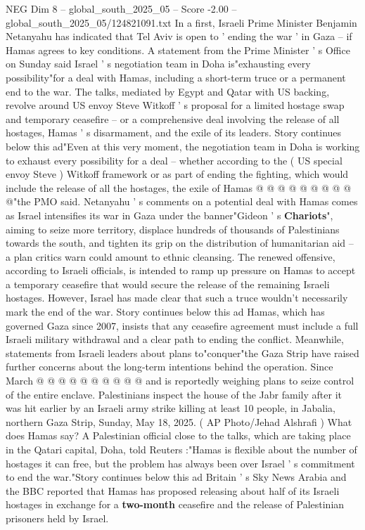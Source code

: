 \begin{textsample}{NEG Dim 8 – global\_south\_2025\_05 – Score -2.00 – global\_south\_2025\_05/124821091.txt}  \label{ex:f8_neg_010}
In a first, Israeli Prime Minister Benjamin Netanyahu has indicated that Tel Aviv is open to ' ending the war ' in Gaza -- if Hamas agrees to key conditions.
A statement from the Prime Minister ' s Office on Sunday said Israel ' s negotiation team in Doha is"exhausting every possibility"for a deal with Hamas, including a short-term truce or a permanent end to the war.
The talks, mediated by Egypt and Qatar with US backing, revolve around US envoy Steve Witkoff ' s proposal for a limited hostage swap and temporary ceasefire -- or a comprehensive deal involving the release of all hostages, Hamas ' s disarmament, and the exile of its leaders.
Story continues below this ad"Even at this very moment, the negotiation team in Doha is working to exhaust every possibility for a deal -- whether according to the ( US special envoy Steve ) Witkoff framework or as part of ending the fighting, which would include the release of all the hostages, the exile of Hamas @ @ @ @ @ @ @ @ @ @"the PMO said.
Netanyahu ' s comments on a potential deal with Hamas comes as Israel intensifies its war in Gaza under the banner"Gideon ' s \textbf{Chariots}", aiming to seize more territory, displace hundreds of thousands of Palestinians towards the south, and tighten its grip on the distribution of humanitarian aid -- a plan critics warn could amount to ethnic cleansing.
The renewed offensive, according to Israeli officials, is intended to ramp up pressure on Hamas to accept a temporary ceasefire that would secure the release of the remaining Israeli hostages.
However, Israel has made clear that such a truce wouldn't necessarily mark the end of the war.
Story continues below this ad Hamas, which has governed Gaza since 2007, insists that any ceasefire agreement must include a full Israeli military withdrawal and a clear path to ending the conflict.
Meanwhile, statements from Israeli leaders about plans to"conquer"the Gaza Strip have raised further concerns about the long-term intentions behind the operation.
Since March @ @ @ @ @ @ @ @ @ @ and is reportedly weighing plans to seize control of the entire enclave.
Palestinians inspect the house of the Jabr family after it was hit earlier by an Israeli army strike killing at least 10 people, in Jabalia, northern Gaza Strip, Sunday, May 18, 2025. ( AP Photo/Jehad Alshrafi ) What does Hamas say?
A Palestinian official close to the talks, which are taking place in the Qatari capital, Doha, told Reuters :"Hamas is flexible about the number of hostages it can free, but the problem has always been over Israel ' s commitment to end the war."Story continues below this ad Britain ' s Sky News Arabia and the BBC reported that Hamas has proposed releasing about half of its Israeli hostages in exchange for a \textbf{two-month} ceasefire and the release of Palestinian prisoners held by Israel.

\end{textsample}
